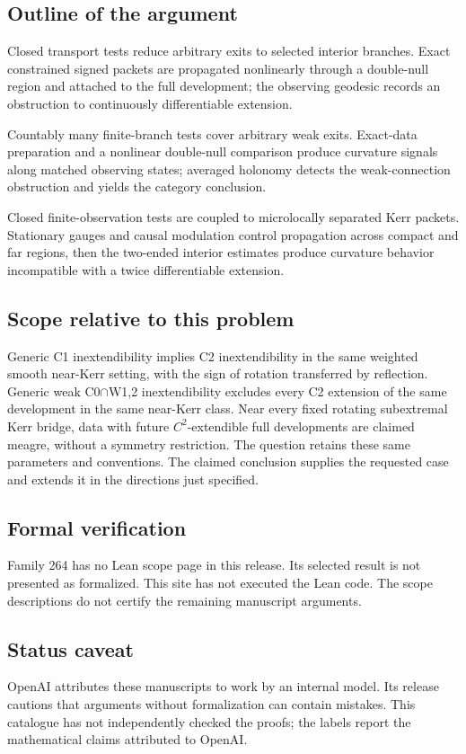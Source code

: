 \documentclass[11pt]{article}
\begin{document}
\subsection{Outline of the argument}
Closed transport tests reduce arbitrary exits to selected interior branches. Exact constrained signed packets are propagated nonlinearly through a double-null region and attached to the full development; the observing geodesic records an obstruction to continuously differentiable extension.

Countably many finite-branch tests cover arbitrary weak exits. Exact-data preparation and a nonlinear double-null comparison produce curvature signals along matched observing states; averaged holonomy detects the weak-connection obstruction and yields the category conclusion.

Closed finite-observation tests are coupled to microlocally separated Kerr packets. Stationary gauges and causal modulation control propagation across compact and far regions, then the two-ended interior estimates produce curvature behavior incompatible with a twice differentiable extension.

\subsection{Scope relative to this problem}
Generic C1 inextendibility implies C2 inextendibility in the same weighted smooth near-Kerr setting, with the sign of rotation transferred by reflection. Generic weak C0\(\cap\)W1,2 inextendibility excludes every C2 extension of the same development in the same near-Kerr class. Near every fixed rotating subextremal Kerr bridge, data with future $C^2$-extendible full developments are claimed meagre, without a symmetry restriction. The question retains these same parameters and conventions. The claimed conclusion supplies the requested case and extends it in the directions just specified.

\subsection{Formal verification}
Family 264 has no Lean scope page in this release. Its selected result is not presented as formalized. This site has not executed the Lean code. The scope descriptions do not certify the remaining manuscript arguments.

\subsection{Status caveat}
OpenAI attributes these manuscripts to work by an internal model. Its release cautions that arguments without formalization can contain mistakes. This catalogue has not independently checked the proofs; the labels report the mathematical claims attributed to OpenAI.
\end{document}
